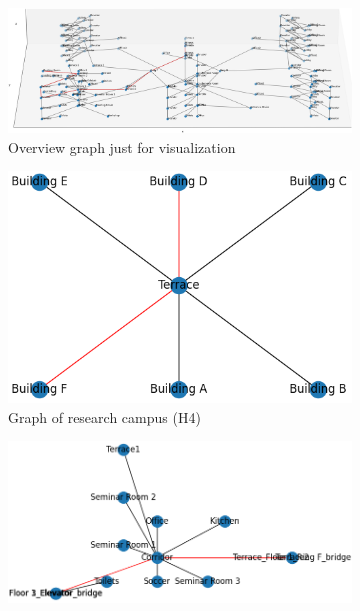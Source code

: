 \begin{figure}[h]
    \captionsetup[subfigure]{justification=centering}
    \centering
    \begin{subfigure}{\textwidth}
      \centering
      \includegraphics[width=\textwidth]{figures/40_concept/ltc_graph_complete.png}
      \caption{Overview graph just for visualization}
    \end{subfigure}
    \begin{subfigure}{.4\textwidth}
      \centering
      \includegraphics[width=\textwidth]{figures/40_concept/ltc_graph_campus.png}
      \caption{Graph of research campus (H4)}
    \end{subfigure}%
    \begin{subfigure}{.6\textwidth}
      \centering
      \includegraphics[width=\textwidth]{figures/40_concept/ltc_graph_floor_2.png}

\end{subfigure}
\end{figure}
